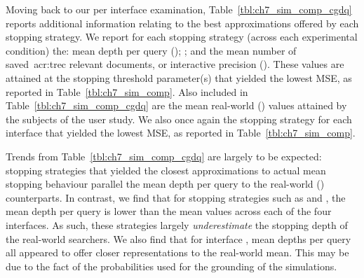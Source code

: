 Moving back to our per interface examination, Table~\ref{tbl:ch7_sim_comp_cgdq} reports additional information relating to the best approximations offered by each stopping strategy. We report for each stopping strategy (across each experimental condition) the: mean depth per query (); ; and the mean number of saved~\gls{acr:trec} relevant documents, or interactive precision (). These values are attained at the stopping threshold parameter(s) that yielded the lowest MSE, as reported in Table~\ref{tbl:ch7_sim_comp}. Also included in Table~\ref{tbl:ch7_sim_comp_cgdq} are the mean real-world () values attained by the subjects of the user study. We also once again  the stopping strategy for each interface that yielded the lowest MSE, as reported in Table~\ref{tbl:ch7_sim_comp}.

Trends from Table~\ref{tbl:ch7_sim_comp_cgdq} are largely to be expected: stopping strategies that yielded the closest approximations to actual mean stopping behaviour parallel the mean depth per query to the real-world () counterparts. In contrast, we find that for stopping strategies such as  and , the mean depth per query is lower than the mean values across each of the four interfaces. As such, these strategies largely \emph{underestimate} the stopping depth of the real-world searchers. We also find that for interface , mean depths per query all appeared to offer closer representations to the real-world mean. This may be due to the fact of the probabilities used for the grounding of the simulations.

